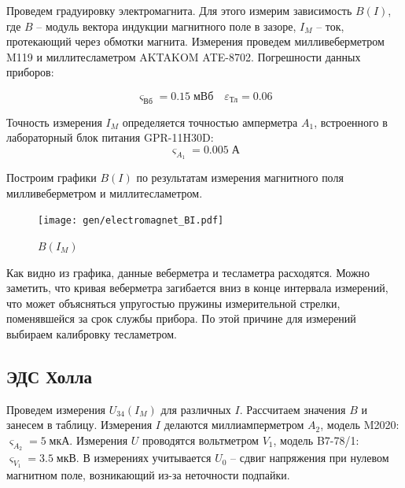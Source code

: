 \documentclass[12pt,a4paper]{article}
\begin{document}
	Проведем градуировку электромагнита. Для этого измерим зависимость $B(I)$, где $B$ -- модуль вектора индукции магнитного поле в зазоре, $I_M$ -- ток, протекающий через обмотки магнита. Измерения проведем милливеберметром M119 и миллитесламетром AKTAKOM ATE-8702. Погрешности данных приборов:
	
	$$ \varsigma_{\text{Вб}} = 0.15 \; \text{мВб} \quad \varepsilon_{\text{Тл}} = 0.06 $$
	
	Точность измерения $I_M$ определяется точностью амперметра $A_1$, встроенного в лабораторный блок питания GPR-11H30D: $$\varsigma_{A_1} = 0.005 \; \text{А}$$
	

	Построим графики $B(I)$ по результатам измерения магнитного поля милливеберметром и миллитесламетром.
	
	\begin{figure}[H]
		\texttt{[image: gen/electromagnet\_BI.pdf]}
		\caption{$B(I_M)$}
	\end{figure}

	Как видно из графика, данные веберметра и тесламетра расходятся. Можно заметить, что кривая веберметра загибается вниз в конце интервала измерений, что может объясняться упругостью пружины измерительной стрелки, поменявшейся за срок службы прибора. По этой причине для измерений выбираем калибровку тесламетром.
	
	\subsection*{ЭДС Холла}

	Проведем измерения $U_{34}(I_M)$ для различных $I$. Рассчитаем значения $B$ и занесем в таблицу.
	Измерения $I$ делаются миллиамперметром $A_2$, модель M2020: $\varsigma_{A_2} = 5 \; \text{мкА} $.
	Измерения $U$ проводятся вольтметром $V_1$, модель B7-78/1: $\varsigma_{V_1} = 3.5 \; \text{мкВ}$.
	В измерениях учитывается $U_0$ -- сдвиг напряжения при нулевом магнитном поле, возникающий из-за неточности подпайки.
	
	
		
\end{document}
